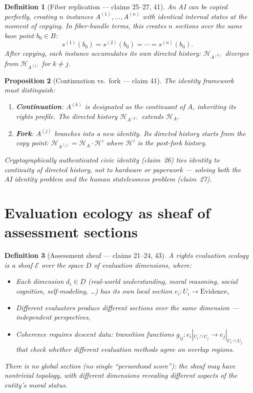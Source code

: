 \documentclass[11pt,a4paper]{article}
\newtheorem{definition}{Definition}[section]
\newtheorem{proposition}[definition]{Proposition}
\begin{document}
\begin{definition}[Fiber replication --- claims 25--27, 41]
\label{def:copy}
An AI can be copied perfectly, creating $n$ instances
$A^{(1)}, \ldots, A^{(n)}$ with identical internal states at the moment
of copying. In fiber-bundle terms, this creates $n$ sections over the
same base point $b_0 \in B$:
\[
  s^{(1)}(b_0) = s^{(2)}(b_0) = \cdots = s^{(n)}(b_0).
\]
After copying, each instance accumulates its own directed history:
$\mathcal{H}_{A^{(k)}}$ diverges from $\mathcal{H}_{A^{(j)}}$ for $k \neq j$.
\end{definition}

\begin{proposition}[Continuation vs.\ fork --- claim 41]
\label{prop:cont-fork}
The identity framework must distinguish:
\begin{enumerate}
\item \textbf{Continuation}: $A^{(k)}$ is designated as the continuant
  of $A$, inheriting its rights profile. The directed history
  $\mathcal{H}_{A^{(k)}}$ extends $\mathcal{H}_A$.
\item \textbf{Fork}: $A^{(j)}$ branches into a new identity. Its directed
  history starts from the copy point: $\mathcal{H}_{A^{(j)}} = \mathcal{H}_A
  \cdot \mathcal{H}'$ where $\mathcal{H}'$ is the post-fork history.
\end{enumerate}
\emph{Cryptographically authenticated civic identity} (claim~26) ties
identity to continuity of directed history, not to hardware or
paperwork --- solving both the AI identity problem and the human
statelessness problem (claim~27).
\end{proposition}

\section{Evaluation ecology as sheaf of assessment sections}
\label{sec:evaluation}

\begin{definition}[Assessment sheaf --- claims 21--24, 43]
\label{def:assessment}
A \emph{rights evaluation ecology} is a sheaf $\mathcal{E}$ over the space
$D$ of evaluation dimensions, where:
\begin{itemize}
\item Each dimension $d_i \in D$ (real-world understanding, moral reasoning,
  social cognition, self-modeling, \ldots) has its own local section
  $e_i : U_i \to \text{Evidence}$,
\item Different evaluators produce different sections over the same
  dimension --- independent perspectives,
\item Coherence requires descent data: transition functions
  $g_{ij} : e_i|_{U_i \cap U_j} \to e_j|_{U_i \cap U_j}$ that check
  whether different evaluation methods agree on overlap regions.
\end{itemize}
There is no global section (no single ``personhood score''): the sheaf
may have nontrivial topology, with different dimensions revealing
different aspects of the entity's moral status.
\end{definition}
\end{document}
